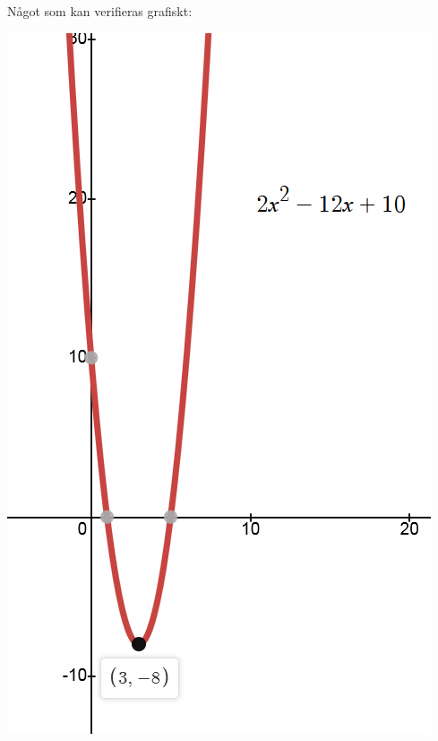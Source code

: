 \documentclass[a4paper,12pt]{article}
\begin{document}
\begin{enumerate}
    Något som kan verifieras grafiskt:

    \begin{center}
        \includegraphics[scale=0.4]{Figur 7.png}
    \end{center}


\end{enumerate}
\end{document}
